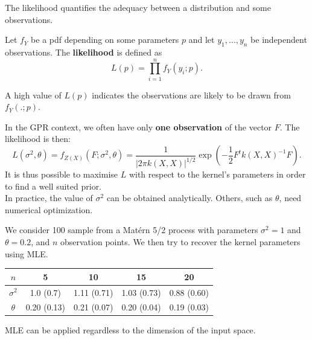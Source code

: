 \documentclass{beamer}
\begin{document}
\begin{frame}{}
The likelihood quantifies the adequacy between a distribution and some observations. 
\begin{definition}
Let $f_Y$ be a pdf depending on some parameters $p$ and let $y_1,\dots,y_n$ be independent observations. The \textbf{likelihood} is defined as 
\begin{equation*}
  L(p) = \prod_{i=1}^n f_Y(y_i;p).
\end{equation*} 
\end{definition}
A high value of $L(p)$ indicates the observations are likely to be drawn from $f_Y(.;p)$.
\end{frame}

\begin{frame}{}
In the GPR context, we often have only \textbf{one observation} of the vector $F$. The likelihood is then:
\footnotesize
\begin{equation*}
  L(\sigma^2,\theta)= f_{Z(X)}(F;\sigma^2,\theta) = \frac{1}{\displaystyle | 2 \pi k(X,X)|^{1/2}} \exp \left(-\frac12 F^t k(X,X)^{-1} F  \right).
\end{equation*} 
\normalsize
It is thus possible to maximise $L$  with respect to the kernel's parameters in order to find a well suited prior.\\
\vspace{5mm}
In practice, %
the value of $\sigma^2$ can be obtained analytically. Others, such as $\theta$, need numerical optimization.
\end{frame}

\begin{frame}{}
\begin{example}
  We consider 100 sample from a  Mat\'ern 5/2 process with parameters $\sigma^2=1$ and $\theta = 0.2$, and $n$ observation points. We then try to recover the kernel parameters using MLE.\\ \vspace{5mm}
  \centering
  \begin{tabular}{|c|cccc|}
    \hline
    $n$ & 5 & 10 & 15 & 20 \\ \hline
    $\sigma^2$ & 1.0 (0.7) & 1.11 (0.71) & 1.03 (0.73) & 0.88 (0.60) \\
    $\theta$ & 0.20 (0.13) & 0.21 (0.07) & 0.20 (0.04) & 0.19 (0.03) \\ \hline
  \end{tabular}
\end{example}
\vspace{5mm}
MLE can be applied regardless to the dimension of the input space.
\end{frame}
\end{document}

